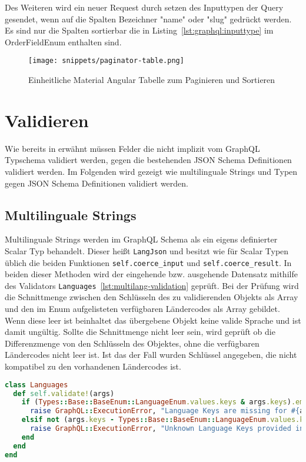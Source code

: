 Des Weiteren wird ein neuer Request durch setzen des Inputtypen der Query gesendet, wenn auf die Spalten Bezeichner "name" oder "slug" gedrückt werden. Es sind nur die Spalten sortierbar die in Listing~\ref{lst:graphql:inputtype} im OrderFieldEnum enthalten sind.

\begin{figure}[h!]
	\centering
	\texttt{[image: snippets/paginator-table.png]}
	\caption{Einheitliche Material Angular Tabelle zum Paginieren und Sortieren}
	\label{impl:graphql:paginator-table}
\end{figure}

\section{Validieren}
\label{graphql:validation}
Wie bereits in  erwähnt müssen Felder die nicht implizit vom GraphQL Typschema validiert werden, gegen die bestehenden JSON Schema Definitionen validiert werden. Im Folgenden wird gezeigt wie multilinguale Strings und Typen gegen JSON Schema Definitionen validiert werden.

\subsection{Multilinguale Strings}
\label{graphql:validation:multi}
Multilinguale Strings werden im GraphQL Schema als ein eigens definierter Scalar Typ behandelt.
Dieser heißt \lstinline|LangJson| und besitzt wie für Scalar Typen üblich die beiden Funktionen \lstinline|self.coerce_input| und \lstinline|self.coerce_result|. In beiden dieser Methoden wird der eingehende bzw. ausgehende Datensatz mithilfe des Validators \lstinline|Languages|~\ref{lst:multilang-validation} geprüft. 
Bei der Prüfung wird die Schnittmenge zwischen den Schlüsseln des zu validierenden Objekts als Array und den im Enum aufgelisteten verfügbaren Ländercodes als Array gebildet. Wenn diese leer ist beinhaltet das übergebene Objekt keine valide Sprache und ist damit ungültig. Sollte die Schnittmenge nicht leer sein, wird geprüft ob die Differenzmenge von den Schlüsseln des Objektes, ohne die verfügbaren Ländercodes nicht leer ist. Ist das der Fall wurden Schlüssel angegeben, die nicht kompatibel zu den vorhandenen Ländercodes ist. 

\begin{lstlisting}[language=Ruby,float=h!,caption={Validator Klasse zum Prüfen, ob der übergebene Parameter die Beschaffenheit eines multilingualen Strings aufweist. \lstinline|/graphql/validators/languages.rb|}, label={lst:multilang-validation}]
class Languages
  def self.validate!(args)
    if (Types::Base::BaseEnum::LanguageEnum.values.keys & args.keys).empty?
      raise GraphQL::ExecutionError, "Language Keys are missing for #{args}"
    elsif not (args.keys - Types::Base::BaseEnum::LanguageEnum.values.keys).empty?
      raise GraphQL::ExecutionError, "Unknown Language Keys provided in #{args}"
    end
  end
end
\end{lstlisting}

